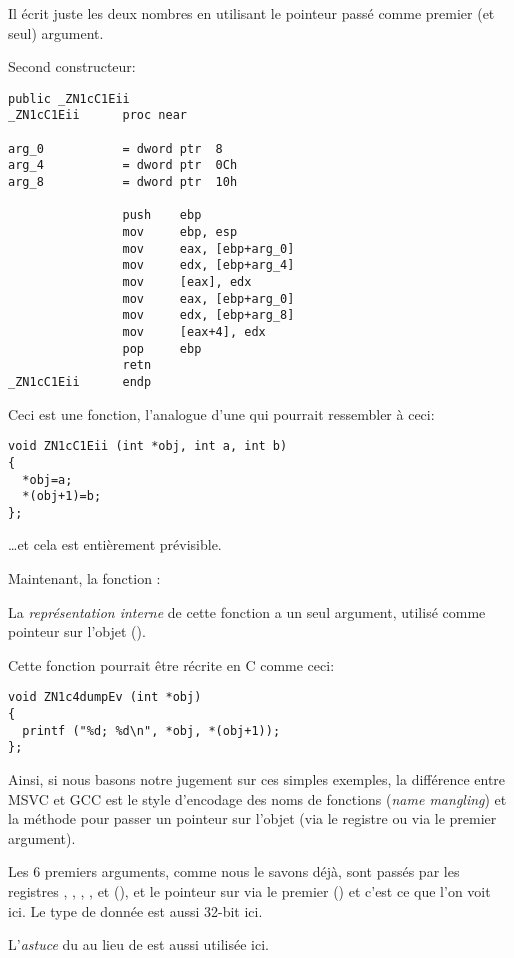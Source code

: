 Il écrit juste les deux nombres en utilisant le pointeur passé comme premier (et
seul) argument.

Second constructeur:

\begin{lstlisting}[style=customasmx86]
                public _ZN1cC1Eii
_ZN1cC1Eii      proc near

arg_0           = dword ptr  8
arg_4           = dword ptr  0Ch
arg_8           = dword ptr  10h

                push    ebp
                mov     ebp, esp
                mov     eax, [ebp+arg_0]
                mov     edx, [ebp+arg_4]
                mov     [eax], edx
                mov     eax, [ebp+arg_0]
                mov     edx, [ebp+arg_8]
                mov     [eax+4], edx
                pop     ebp
                retn
_ZN1cC1Eii      endp
\end{lstlisting}

Ceci est une fonction, l'analogue d'une qui pourrait ressembler à ceci:

\begin{lstlisting}[style=customc]
void ZN1cC1Eii (int *obj, int a, int b)
{
  *obj=a;
  *(obj+1)=b;
};
\end{lstlisting}

\dots et cela est entièrement prévisible.

Maintenant, la fonction :



La \emph{représentation interne} de cette fonction a un seul argument, utilisé comme
pointeur sur l'objet (\ITthis).

Cette fonction pourrait être récrite en C comme ceci:

\begin{lstlisting}[style=customc]
void ZN1c4dumpEv (int *obj)
{
  printf ("%d; %d\n", *obj, *(obj+1));
};
\end{lstlisting}

Ainsi, si nous basons notre jugement sur ces simples exemples, la différence entre
MSVC et GCC est le style d'encodage des noms de fonctions (\emph{name mangling}) et
la méthode pour passer un pointeur sur l'objet (via le registre \ECX ou via le premier
argument).


Les 6 premiers arguments, comme nous le savons déjà, sont passés par les registres
\RDI, \RSI, \RDX, \RCX,  et  (\SysVABI),
et le pointeur sur \ITthis via le premier (\RDI) et c'est ce que l'on voit ici.
Le type de donnée \Tint est aussi 32-bit ici.

L'\emph{astuce} du \JMP au lieu de \RET est aussi utilisée ici.



